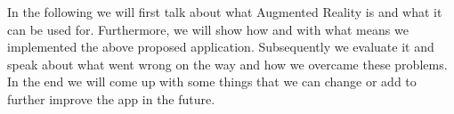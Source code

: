 In the following we will first talk about what Augmented Reality is and what it can be used for. Furthermore, we will show how and with what means we implemented the above proposed application. Subsequently we evaluate it and speak about what went wrong on the way and how we overcame these problems. In the end we will come up with some things that we can change or add to further improve the app in the future.



